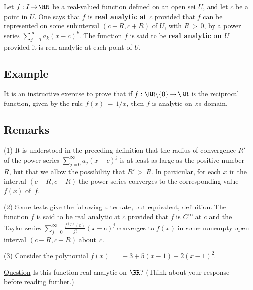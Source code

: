 \V

        Let $f:I \,{\rightarrow}\, {\RR}$ be a real-valued function defined on an open set $U$, and let $c$ be a point in $U$.
    One says that $f$ is {\bf real analytic at $c$} provided that $f$ can be represented on some subinterval $(c-R,c+R)$ of $U$, with $R\,>\,0$,
    by a power series $\sum_{j=0}^{{\infty}} a_{k}(x-c)^{k}$.
    The function $f$ is said to be {\bf real analytic on $U$} provided it is real analytic at each point of $U$.


\V

        \subsection{\small{{\bf Example}}}
        \label{ExampG60.115}

        It is an instructive exercise to prove that if $f:{\RR}{\setminus}\{0\} \,{\rightarrow}\, {\RR}$ is the reciprocal function,
    given by the rule $f(x) \,=\, 1/x$, then $f$ is analytic on its domain.

\V
\V

        \subsection{\small{{\bf Remarks}}}
        \label{RemrkG60.120}

\V

\hspace*{\parindent}(1) It is understood in the preceding definition that the radius of convergence $R'$ of the power series
    $\sum_{j=0}^{{\infty}} a_{j}(x-c)^{j}$ is at least as large as the positive number $R$, but that we allow the possibility that $R'\,>\,R$.
    In particular, for each $x$ in the interval $(c-R,c+R)$ the power series converges to the corresponding value $f(x)$ of~$f$.

\V

        (2) Some texts give the following alternate, but equivalent, definition: The function $f$ is said to be real analytic at $c$
    provided that $f$ is $C^{{\infty}}$ at $c$ and the Taylor series ${\displaystyle \sum_{j=0}^{{\infty}} \frac{f^{(j)}(c)}{j!}(x-c)^{j}}$
    converges to $f(x)$ in some nonempty open interval $(c-R,c+R)$ about~$c$.

\V

        (3) Consider the polynomial $f(x) \,=\, -3 + 5(x-1) + 2(x-1)^{2}$.

        \underline{Question} Is this function real analytic on ${\RR}$? (Think about your response before reading further.)

